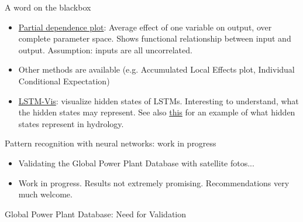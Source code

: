 \documentclass[color=usenames,dvipsnames]{beamer}
\begin{document}
\begin{frame}{A word on the blackbox}
\begin{itemize}
	\item \href{https://christophm.github.io/interpretable-ml-book/pdp.html}{Partial dependence plot}: Average effect of one variable on output, over complete parameter space. Shows functional relationship between input and output. Assumption: inputs are all uncorrelated.
	\item Other methods are available (e.g. Accumulated Local Effects plot, Individual Conditional Expectation)  
	\item \href{http://lstm.seas.harvard.edu/}{LSTM-Vis}: visualize hidden states of LSTMs. Interesting to understand, what the hidden states may represent. See also \href{https://arxiv.org/pdf/1903.07903.pdf}{this} for an example of what hidden states represent in hydrology.
\end{itemize}
\end{frame}

\begin{frame}{Pattern recognition with neural networks: work in progress}
\begin{itemize}
	\item Validating the Global Power Plant Database with satellite fotos...
	\item Work in progress. Results not extremely promising. Recommendations very much welcome.
\end{itemize}
\end{frame}


\begin{frame}{Global Power Plant Database: Need for Validation}

\end{frame}
\end{document}
